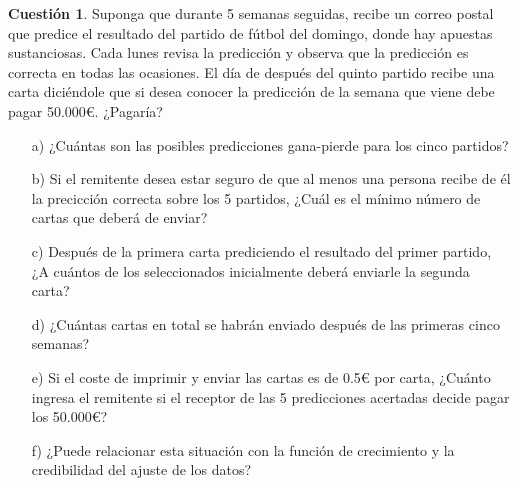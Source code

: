 \documentclass[a4paper, 11pt]{article}
\theoremstyle{definition}
\newtheorem{cuestion}{Cuestión}
\begin{document}
  \begin{cuestion}
    Suponga que durante 5 semanas seguidas, recibe un correo postal que predice el resultado del partido de fútbol del domingo, donde hay apuestas sustanciosas. Cada lunes revisa la predicción y observa que la predicción es correcta en todas las ocasiones. El día de después del quinto partido recibe una carta diciéndole que si desea conocer la predicción de la semana que viene debe pagar 50.000\euro{}. ¿Pagaría?

    \begin{enumerate}
      \item[a)] ¿Cuántas son las posibles predicciones gana-pierde para los cinco partidos?
      \item[b)] Si el remitente desea estar seguro de que al menos una persona recibe de él la precicción correcta sobre los 5 partidos, ¿Cuál es el mínimo número de cartas que deberá de enviar?
      \item[c)] Después de la primera carta prediciendo el resultado del primer partido, ¿A cuántos de los seleccionados inicialmente deberá enviarle la segunda carta?
      \item[d)] ¿Cuántas cartas en total se habrán enviado después de las primeras cinco semanas?
      \item[e)] Si el coste de imprimir y enviar las cartas es de 0.5€ por carta, ¿Cuánto ingresa el remitente si el receptor de las 5 predicciones acertadas decide pagar los 50.000\euro{}?
      \item[f)] ¿Puede relacionar esta situación con la función de crecimiento y la credibilidad del ajuste de los datos?
    \end{enumerate}
  \end{cuestion}
\end{document}
